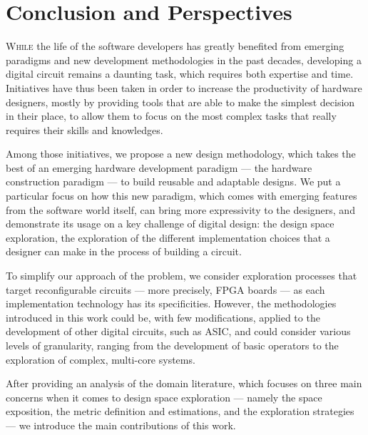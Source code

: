 \chapter{Conclusion and Perspectives}


\vspace{-0.6cm}
\lettrine[lines=2]{W}{hile} the life of the software developers has greatly benefited from emerging paradigms and new development methodologies in the past decades, developing a digital circuit remains a daunting task, which requires both expertise and time.
Initiatives have thus been taken in order to increase the productivity of hardware designers, mostly by providing tools that are able to make the simplest decision in their place, to allow them to focus on the most complex tasks that really requires their skills and knowledges.

Among those initiatives, we propose a new design methodology, which takes the best of an emerging hardware development paradigm --- the hardware construction paradigm --- to build reusable and adaptable designs.
We put a particular focus on how this new paradigm, which comes with emerging features from the software world itself, can bring more expressivity to the designers, and demonstrate its usage on a key challenge of digital design: the design space exploration, \ie the exploration of the different implementation choices that a designer can make in the process of building a circuit.

To simplify our approach of the problem, we consider exploration processes that target reconfigurable circuits --- more precisely, FPGA boards --- as each implementation technology has its specificities.
However, the methodologies introduced in this work could be, with few modifications, applied to the development of other digital circuits, such as ASIC, and could consider various levels of granularity, ranging from the development of basic operators to the exploration of complex, multi-core systems.

After providing an analysis of the domain literature, which focuses on three main concerns when it comes to design space exploration --- namely the space exposition, the metric definition and estimations, and the exploration strategies --- we introduce the main contributions of this work.

